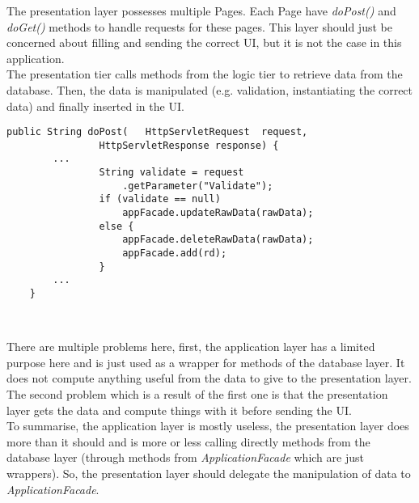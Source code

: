 The presentation layer possesses multiple Pages. Each Page have \emph{doPost()}
and \emph{doGet()} methods to handle requests for these pages. This layer should
just be concerned about filling and sending the correct UI, but it is not the
case in this application.\\

The presentation tier calls methods from the logic tier to retrieve data from
the database. Then, the data is manipulated (e.g. validation, instantiating the
correct data) and finally inserted in the UI.\\

\begin{lstlisting}[caption={data validation in AdministrationPage}]
	public String doPost(	HttpServletRequest	request,
				HttpServletResponse	response) {
		...
				String validate = request
					.getParameter("Validate");
				if (validate == null)
					appFacade.updateRawData(rawData);
				else {
					appFacade.deleteRawData(rawData);
					appFacade.add(rd);
				}
        ...
    }
\end{lstlisting}
\

There are multiple problems here, first, the application layer has a limited
purpose here and is just used as a wrapper for methods of the database layer. It
does not compute anything useful from the data to give to the presentation layer.
The second problem which is a result of the first one is that the presentation
layer gets the data and compute things with it before sending the UI.\\

To summarise, the application layer is mostly useless, the presentation layer
does more than it should and is more or less calling directly methods from the
database layer (through methods from \emph{ApplicationFacade} which are just
wrappers). So, the presentation layer should delegate the manipulation of data
to \emph{ApplicationFacade}.

\newpage
